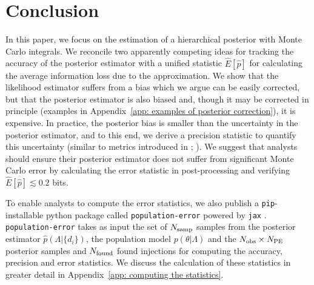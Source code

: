 \section{Conclusion}
\label{sec: mc conclusion}

In this paper, we focus on the estimation of a hierarchical posterior with Monte Carlo integrals. We reconcile two apparently competing ideas for tracking the accuracy of the posterior estimator with a unified statistic $\hat{E}[\hat{p}]$ for calculating the average information loss due to the approximation. We show that the likelihood estimator suffers from a bias which we argue can be easily corrected, but that the posterior estimator is also biased and, though it may be corrected in principle (examples in Appendix~\ref{app: examples of posterior correction}), it is expensive. In practice, the posterior bias is smaller than the uncertainty in the posterior estimator, and to this end, we derive a precision statistic to quantify this uncertainty (similar to metrics introduced in \citet{Essick:2022ojx}; \citet{Talbot:2023pex}). We suggest that analysts should ensure their posterior estimator does not suffer from significant Monte Carlo error by calculating the error statistic in post-processing and verifying $\hat{E}[\hat{p}] \lesssim 0.2$ bits. 

To enable analysts to compute the error statistics, we also publish a \texttt{pip}-installable python package called \texttt{population-error} \citep{population_error2025github} powered by \texttt{jax} \citep{jax2018github}.  \texttt{population-error} takes as input the set of $N_{\rm samp}$ samples from the posterior estimator $\hat{p}(\Lambda | \{d_i\})$, the population model $p(\theta|\Lambda)$ and the $N_{\rm obs}\times N_{\rm PE}$ posterior samples and $N_{\rm found}$ found injections for computing the accuracy, precision and error statistics. We discuss the calculation of these statistics in greater detail in Appendix~\ref{app: computing the statistics}.



